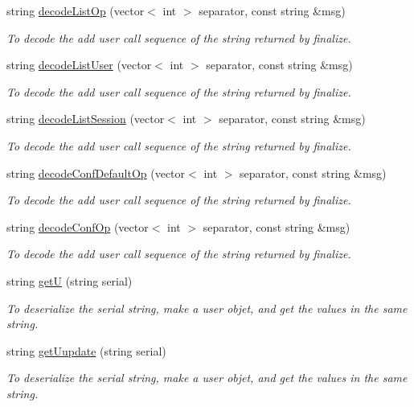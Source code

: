 \begin{DoxyCompactItemize}
string \hyperlink{classUMSMapper_a72267ca71cc620570a238dfec3f0519f}{decodeListOp} (vector$<$ int $>$ separator, const string \&msg)
\begin{DoxyCompactList}\small\item\em To decode the add user call sequence of the string returned by finalize. \item\end{DoxyCompactList}\item 
string \hyperlink{classUMSMapper_a569b2de623104e451711ff14b1f8f84f}{decodeListUser} (vector$<$ int $>$ separator, const string \&msg)
\begin{DoxyCompactList}\small\item\em To decode the add user call sequence of the string returned by finalize. \item\end{DoxyCompactList}\item 
string \hyperlink{classUMSMapper_a750e6d307c48491a86a97d694807ca66}{decodeListSession} (vector$<$ int $>$ separator, const string \&msg)
\begin{DoxyCompactList}\small\item\em To decode the add user call sequence of the string returned by finalize. \item\end{DoxyCompactList}\item 
string \hyperlink{classUMSMapper_ad157fb31bec53a8c140fb2e2d60465b3}{decodeConfDefaultOp} (vector$<$ int $>$ separator, const string \&msg)
\begin{DoxyCompactList}\small\item\em To decode the add user call sequence of the string returned by finalize. \item\end{DoxyCompactList}\item 
string \hyperlink{classUMSMapper_ac1f47841882d3f85b8820ab836789036}{decodeConfOp} (vector$<$ int $>$ separator, const string \&msg)
\begin{DoxyCompactList}\small\item\em To decode the add user call sequence of the string returned by finalize. \item\end{DoxyCompactList}\item 
string \hyperlink{classUMSMapper_a60bb02d794c885f5e0feae133af7058d}{getU} (string serial)
\begin{DoxyCompactList}\small\item\em To deserialize the serial string, make a user objet, and get the values in the same string. \item\end{DoxyCompactList}\item 
string \hyperlink{classUMSMapper_aadfd01766b31dfe8b40710b8b3bb432c}{getUupdate} (string serial)
\begin{DoxyCompactList}\small\item\em To deserialize the serial string, make a user objet, and get the values in the same string. \item\end{DoxyCompactList}\end{DoxyCompactItemize}


